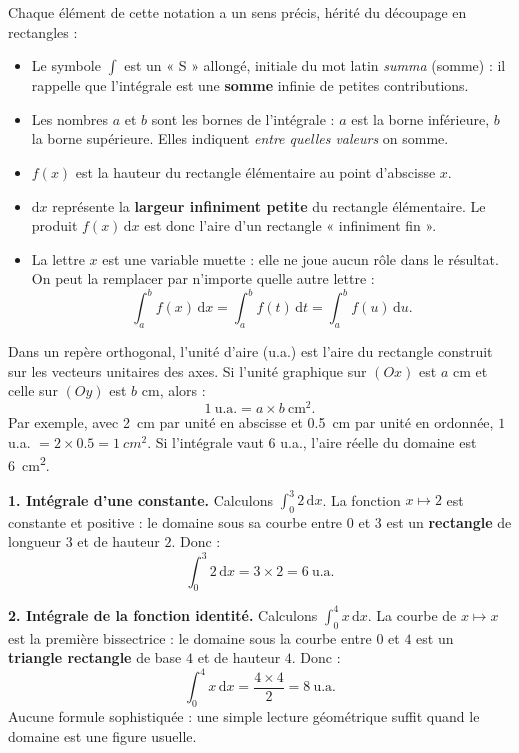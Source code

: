 \documentclass[11pt]{article}
\newcommand{\cle}[1]{{\popxbold\color{popdark}#1}}
\newcounter{popsec}
\newcounter{popsub}
\newcommand{\courssub}[1]{%
  \stepcounter{popsub}%
  \par\vspace{9pt}\noindent{\popxbold\fontsize{11.5}{13}\selectfont\color{popink}{\color{poporange}\thepopsec.\thepopsub}\hspace{6pt}#1}\par\nopagebreak\vspace{4pt}
}
\begin{document}
\courssub{Lecture de la notation $\displaystyle\int_a^b f(x)\,\mathrm{d}x$}

Chaque élément de cette notation a un sens précis, hérité du découpage en rectangles :

\begin{itemize}
\item Le symbole $\displaystyle\int$ est un « S » allongé, initiale du mot latin \emph{summa} (somme) : il rappelle que l'intégrale est une \textbf{somme} infinie de petites contributions.
\item Les nombres $a$ et $b$ sont les \cle{bornes} de l'intégrale : $a$ est la borne inférieure, $b$ la borne supérieure. Elles indiquent \emph{entre quelles valeurs} on somme.
\item $f(x)$ est la hauteur du rectangle élémentaire au point d'abscisse $x$.
\item $\mathrm{d}x$ représente la \textbf{largeur infiniment petite} du rectangle élémentaire. Le produit $f(x)\,\mathrm{d}x$ est donc l'aire d'un rectangle « infiniment fin ».
\item La lettre $x$ est une \cle{variable muette} : elle ne joue aucun rôle dans le résultat. On peut la remplacer par n'importe quelle autre lettre :
\[ \int_a^b f(x)\,\mathrm{d}x = \int_a^b f(t)\,\mathrm{d}t = \int_a^b f(u)\,\mathrm{d}u. \]
\end{itemize}

\begin{aretenir}
Dans un repère orthogonal, l'\cle{unité d'aire} (u.a.) est l'aire du rectangle construit sur les vecteurs unitaires des axes. Si l'unité graphique sur $(Ox)$ est $a$ cm et celle sur $(Oy)$ est $b$ cm, alors :
\[ 1\ \text{u.a.} = a \times b\ \text{cm}^2. \]
Par exemple, avec \SI{2}{cm} par unité en abscisse et \SI{0,5}{cm} par unité en ordonnée, $1$ u.a. $= 2 \times \num{0,5} = \SI{1}{cm^2}$. Si l'intégrale vaut $6$ u.a., l'aire réelle du domaine est \SI{6}{cm^2}.
\end{aretenir}

\begin{exemplebox}
\textbf{1. Intégrale d'une constante.} Calculons $\displaystyle\int_0^3 2\,\mathrm{d}x$. La fonction $x \mapsto 2$ est constante et positive : le domaine sous sa courbe entre $0$ et $3$ est un \textbf{rectangle} de longueur $3$ et de hauteur $2$. Donc :
\[ \int_0^3 2\,\mathrm{d}x = 3 \times 2 = 6\ \text{u.a.} \]

\textbf{2. Intégrale de la fonction identité.} Calculons $\displaystyle\int_0^4 x\,\mathrm{d}x$. La courbe de $x \mapsto x$ est la première bissectrice : le domaine sous la courbe entre $0$ et $4$ est un \textbf{triangle rectangle} de base $4$ et de hauteur $4$. Donc :
\[ \int_0^4 x\,\mathrm{d}x = \frac{4 \times 4}{2} = 8\ \text{u.a.} \]
Aucune formule sophistiquée : une simple lecture géométrique suffit quand le domaine est une figure usuelle.
\end{exemplebox}
\end{document}
